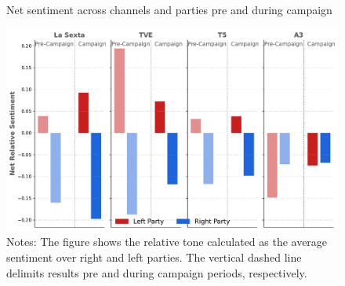 \documentclass[12pt]{article}
\begin{document}
	\begin{figure}[H]
		\caption{Net sentiment across channels and parties pre and during campaign }
		\centering
		\includegraphics[width=150mm]{figures/average_tone_pre_post_election}
		\caption*{\small Notes: The figure shows the relative tone calculated as the average sentiment over right and left parties. The vertical dashed line delimits results pre and during campaign periods, respectively. }
		\label{fig:tone2}
	\end{figure}
	

	
\end{document}
